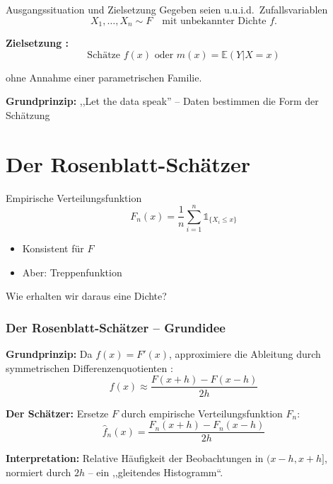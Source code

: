 \documentclass{beamer}
\newif\ifpauseswitch
\begin{document}
	\begin{frame}{Ausgangssituation und Zielsetzung}
		Gegeben seien u.u.i.d.\ Zufallsvariablen
		\[
		X_1,\dots,X_n \sim F
		\quad\text{mit unbekannter Dichte } f.
		\]
		
		\vspace{0.5cm}
		\textbf{Zielsetzung \cite{BüningTrenkler+1994}:}
		\[
		\text{Schätze } f(x) \text{ oder } m(x)=\mathbb E(Y|X=x)
		\]
		
		\alert{ohne Annahme einer parametrischen Familie.}
		
		\vspace{0.5cm}
		\textbf{Grundprinzip:} ,,Let the data speak'' – Daten bestimmen die Form der Schätzung
	\end{frame}
	
	\section{Der Rosenblatt-Schätzer}
	
	\begin{frame}{Empirische Verteilungsfunktion}
		\[
		F_n(x)=\frac1n\sum_{i=1}^n \mathds{1}_{\{X_i\le x\}}
		\]
		
		\begin{itemize}
			\item Konsistent für $F$
			\item Aber: Treppenfunktion
		\end{itemize}
		
		\alert{Wie erhalten wir daraus eine Dichte?}
	\end{frame}
	
	\begin{frame}
		\frametitle{Der Rosenblatt-Schätzer – Grundidee}
		
		\textbf{Grundprinzip:} Da $f(x) = F'(x)$, approximiere die Ableitung durch symmetrischen Differenzenquotienten \cite{Rosenblatt1956}:
		\[
		f(x) \approx \frac{F(x+h) - F(x-h)}{2h}
		\]
		
		\ifpauseswitch
		\pause
		\fi
		
		\textbf{Der Schätzer:} Ersetze $F$ durch empirische Verteilungsfunktion $F_n$:
		\begin{equation}
			\hat{f}_n(x) = \frac{F_n(x+h) - F_n(x-h)}{2h}
		\end{equation}
		
		\textbf{Interpretation:} Relative Häufigkeit der Beobachtungen in $(x-h, x+h]$, normiert durch $2h$ – ein ,,gleitendes Histogramm``.
	\end{frame}
	
\end{document}
